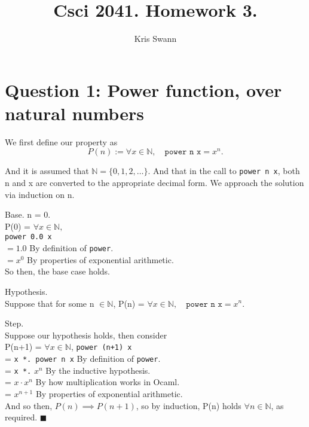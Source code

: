 \documentclass{article}
\begin{document}
\title{Csci 2041. Homework 3.}
\author{Kris Swann}

\maketitle





\section{Question 1: Power function, over natural numbers}
\noindent
We first define our property as
\[ P(n) := \forall x \in \mathbb{N}, \quad \texttt{power n x} = x^n. \]

\noindent
And it is assumed that $\mathbb{N} = \{0, 1, 2, \dots \}$. And that in the call to
\texttt{power n x}, both n and x are converted to the appropriate decimal form.
We approach the solution via induction on n.

\bigskip

\noindent
Base. n = 0. \\
\indent P(0) = $\forall x \in \mathbb{N},$ \\
\indent \texttt{power 0.0 x} \\
\indent $= 1.0$ \qquad By definition of \texttt{power}. \\
\indent $= x^0$ \qquad By properties of exponential arithmetic. \\
\noindent So then, the base case holds.

\bigskip

\noindent
Hypothesis. \\
\indent Suppose that for some n $\in \mathbb{N}$, P(n) = $\forall x \in \mathbb{N}, \quad \texttt{power n x} = x^n$.

\bigskip

\noindent
Step. \\
Suppose our hypothesis holds, then consider \\
\indent P(n+1) = $\forall x \in \mathbb{N}$,
\indent \texttt{power (n+1) x} \\
\indent = \texttt{x *. power n x} \qquad By definition of \texttt{power}. \\
\indent = \texttt{x *.} $x^n$ \qquad By the inductive hypothesis. \\
\indent = $x \cdot x^n$ \qquad By how multiplication works in Ocaml. \\
\indent = $x^{n+1}$ \qquad By properties of exponential arithmetic. \\
\noindent And so then, $P(n) \implies P(n+1)$, so by induction, P(n) holds $\forall n \in \mathbb{N}$, as required. $\blacksquare$
\end{document}
